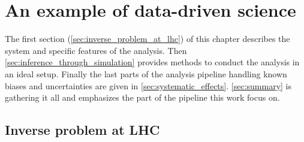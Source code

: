 
\chapter{An example of data-driven science}  %
\label{chap:intro_stat}
\ifpdf
    \graphicspath{{Chapter1/Figs/Raster/}{Chapter1/Figs/PDF/}{Chapter1/Figs/}}
\else
    \graphicspath{{Chapter1/Figs/Vector/}{Chapter1/Figs/}}
\fi










The first section (\autoref{sec:inverse_problem_at_lhc}) of this chapter describes the system and specific features of the analysis.
Then \autoref{sec:inference_through_simulation} provides methods to conduct the analysis in an ideal setup.
Finally the last parts of the analysis pipeline handling known biases and uncertainties are given in \autoref{sec:systematic_effects}.
\autoref{sec:summary} is gathering it all and emphasizes the part of the pipeline this work focus on.



\section{Inverse problem at LHC} %
\label{sec:inverse_problem_at_lhc}







